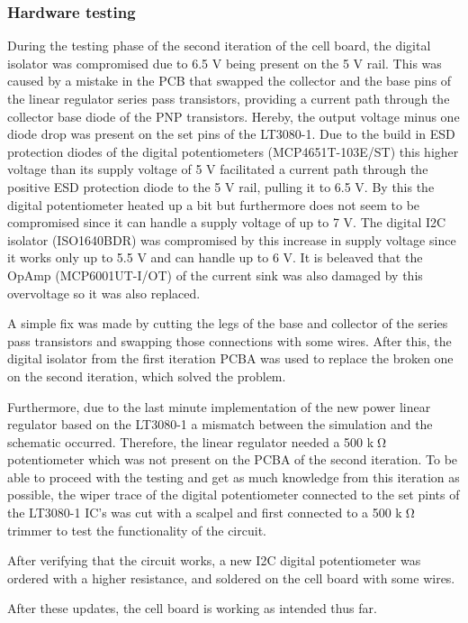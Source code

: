 \subsubsection{Hardware testing}
During the testing phase of the second iteration of the cell board, the digital isolator was compromised due to 6.5 V being present on the 5 V rail. This was caused by a mistake in the PCB that swapped the collector and the base pins of the linear regulator series pass transistors, providing a current path through the collector base diode of the PNP transistors. Hereby, the output voltage minus one diode drop was present on the set pins of the LT3080-1. Due to the build in ESD protection diodes of the digital potentiometers (MCP4651T-103E/ST) this higher voltage than its supply voltage of 5 V facilitated a current path through the positive ESD protection diode to the 5 V rail, pulling it to 6.5 V. By this the digital potentiometer heated up a bit but furthermore does not seem to be compromised since it can handle a supply voltage of up to 7 V. The digital I2C isolator (ISO1640BDR) was compromised by this increase in supply voltage since it works only up to 5.5 V and can handle up to 6 V. It is beleaved that the OpAmp (MCP6001UT-I/OT) of the current sink was also damaged by this overvoltage so it was also replaced.

A simple fix was made by cutting the legs of the base and collector of the series pass transistors and swapping those connections with some wires. After this, the digital isolator from the first iteration PCBA was used to replace the broken one on the second iteration, which solved the problem.

Furthermore, due to the last minute implementation of the new power linear regulator based on the LT3080-1 a mismatch between the simulation and the schematic occurred. Therefore, the linear regulator needed a 500 k$\tcohm$ potentiometer which was not present on the PCBA of the second iteration. To be able to proceed with the testing and get as much knowledge from this iteration as possible, the wiper trace of the digital potentiometer connected to the set pints of the LT3080-1 IC's was cut with a scalpel and first connected to a 500 k$\tcohm$ trimmer to test the functionality of the circuit.

After verifying that the circuit works, a new I2C digital potentiometer was ordered with a higher resistance, and soldered on the cell board with some wires.

After these updates, the cell board is working as intended thus far.